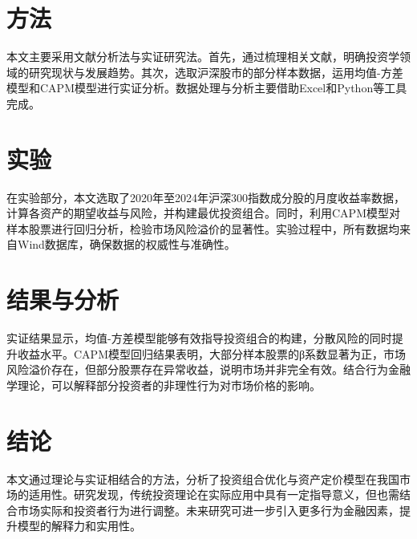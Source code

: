 \documentclass[UTF-8]{CUFEpaper}
\begin{document}
\section{方法}
本文主要采用文献分析法与实证研究法。首先，通过梳理相关文献，明确投资学领域的研究现状与发展趋势。其次，选取沪深股市的部分样本数据，运用均值-方差模型和CAPM模型进行实证分析。数据处理与分析主要借助Excel和Python等工具完成。

\section{实验}
在实验部分，本文选取了2020年至2024年沪深300指数成分股的月度收益率数据，计算各资产的期望收益与风险，并构建最优投资组合。同时，利用CAPM模型对样本股票进行回归分析，检验市场风险溢价的显著性。实验过程中，所有数据均来自Wind数据库，确保数据的权威性与准确性。

\section{结果与分析}
实证结果显示，均值-方差模型能够有效指导投资组合的构建，分散风险的同时提升收益水平。CAPM模型回归结果表明，大部分样本股票的β系数显著为正，市场风险溢价存在，但部分股票存在异常收益，说明市场并非完全有效。结合行为金融学理论，可以解释部分投资者的非理性行为对市场价格的影响。

\section{结论}
本文通过理论与实证相结合的方法，分析了投资组合优化与资产定价模型在我国市场的适用性。研究发现，传统投资理论在实际应用中具有一定指导意义，但也需结合市场实际和投资者行为进行调整。未来研究可进一步引入更多行为金融因素，提升模型的解释力和实用性。
\end{document}
